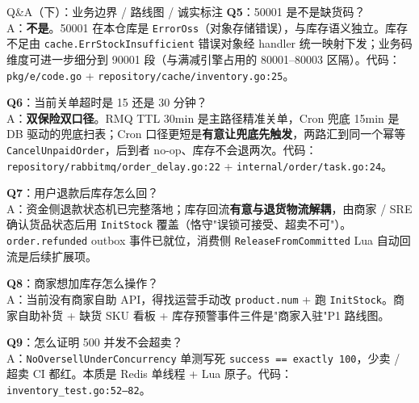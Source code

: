 \documentclass[aspectratio=169,11pt]{beamer}
\begin{document}
\begin{frame}[allowframebreaks]{Q\&A（下）：业务边界 / 路线图 / 诚实标注}
\footnotesize
\textbf{Q5}：50001 是不是缺货码？\\
\hspace{4mm} A：\textbf{不是}。50001 在本仓库是 \texttt{ErrorOss}（对象存储错误），与库存语义独立。库存不足由 \texttt{cache.ErrStockInsufficient} 错误对象经 handler 统一映射下发；业务码维度可进一步细分到 90001 段（与满减引擎占用的 80001--80003 区隔）。代码：\texttt{pkg/e/code.go} + \texttt{repository/cache/inventory.go:25}。

\vspace{1mm}
\textbf{Q6}：当前关单超时是 15 还是 30 分钟？\\
\hspace{4mm} A：\textbf{双保险双口径}。RMQ TTL 30min 是主路径精准关单，Cron 兜底 15min 是 DB 驱动的兜底扫表；Cron 口径更短是\textbf{有意让兜底先触发}，两路汇到同一个幂等 \texttt{CancelUnpaidOrder}，后到者 no-op、库存不会退两次。代码：\texttt{repository/rabbitmq/order\_delay.go:22} + \texttt{internal/order/task.go:24}。

\vspace{1mm}
\textbf{Q7}：用户退款后库存怎么回？\\
\hspace{4mm} A：资金侧退款状态机已完整落地；库存回流\textbf{有意与退货物流解耦}，由商家 / SRE 确认货品状态后用 \texttt{InitStock} 覆盖（恪守"误锁可接受、超卖不可"）。\texttt{order.refunded} outbox 事件已就位，消费侧 \texttt{ReleaseFromCommitted} Lua 自动回流是后续扩展项。

\vspace{1mm}
\textbf{Q8}：商家想加库存怎么操作？\\
\hspace{4mm} A：当前没有商家自助 API，得找运营手动改 \texttt{product.num} + 跑 \texttt{InitStock}。商家自助补货 + 缺货 SKU 看板 + 库存预警事件三件是"商家入驻"P1 路线图。

\vspace{1mm}
\textbf{Q9}：怎么证明 500 并发不会超卖？\\
\hspace{4mm} A：\texttt{NoOversellUnderConcurrency} 单测写死 \texttt{success == exactly 100}，少卖 / 超卖 CI 都红。本质是 Redis 单线程 + Lua 原子。代码：\texttt{inventory\_test.go:52--82}。
\end{frame}
\end{document}
